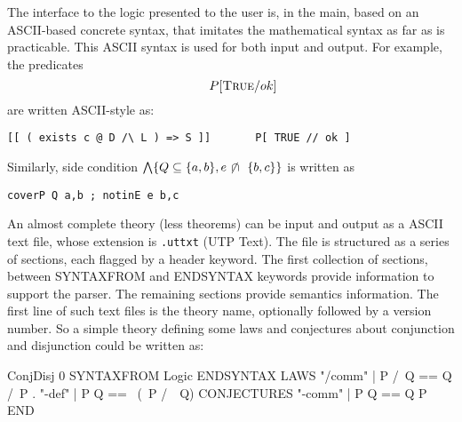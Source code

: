 
The interface to the logic presented to the user is,
in the main, based on an ASCII-based concrete syntax,
that imitates the mathematical syntax as far as is practicable.
This ASCII syntax is used for both input and output.
For example, the predicates
\begin{equation*}
 [ (\exists c @ D \land L) \implies S ]
 \qquad
 P[\True/ok]
\end{equation*}
are written ASCII-style as:
\begin{center}
    \verb"[[ ( exists c @ D /\ L ) => S ]]       P[ TRUE // ok ]"
\end{center}
Similarly, side condition
$
   \bigwedge\{Q \subseteq \{a,b\}, e \mathrel{\not\!\cap~} \{b,c\} \}
$
is written as
\begin{center}
    \verb"coverP Q a,b ; notinE e b,c"
\end{center}

An almost complete theory (less theorems)
can be input and output as a ASCII text file,
whose extension is \verb".uttxt" (UTP Text).
The file is structured as a series of sections,
each flagged by a header keyword.
The first collection of sections,
between SYNTAXFROM and ENDSYNTAX keywords
provide information to support the parser.
The remaining sections provide semantics information.
The first line of such text files is the theory name,
optionally followed by a version number.
So a simple theory defining some laws and conjectures about conjunction
and disjunction could be written as:
\begin{haskell}
ConjDisj 0
SYNTAXFROM
 Logic
ENDSYNTAX
LAWS
  "/\-comm" | P /\ Q == Q /\ P .
  "\/-def"  | P \/ Q == ~(~P /\ ~Q)
CONJECTURES
  "\/-comm" | P \/ Q == Q \/ P
END
\end{haskell}
